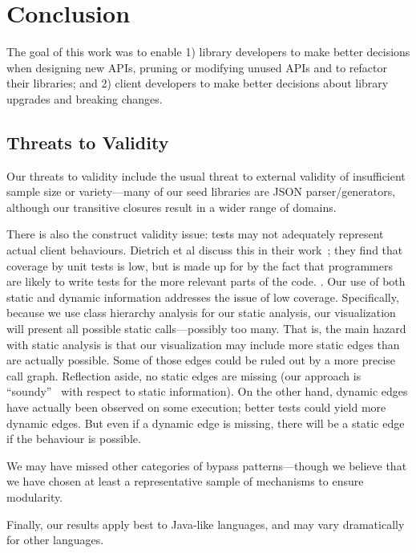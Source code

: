\chapter{Conclusion}
\label{sec:conclusion}
The goal of this work was to enable 1) library developers to make better
decisions when designing new APIs, pruning or modifying unused APIs and to refactor their
libraries; and 2) client developers to make better decisions about library
upgrades and breaking changes.

\section{Threats to Validity}
Our threats to validity include the usual threat to external validity
of insufficient sample size or variety---many of our seed libraries
are JSON parser/generators, although our transitive closures result in
a wider range of domains.

There is also the construct validity issue: tests may
not adequately represent actual client behaviours. 
Dietrich et al discuss this in their work~\cite{dietrich2017construction}; 
they find that coverage by unit tests is low, 
but is made up for by the fact that programmers are likely to write tests for the more relevant parts of the code.
.
Our use of both static
and dynamic information addresses the issue of low coverage. 
Specifically, because we use
class hierarchy analysis for our static analysis, our visualization will present
all possible static calls---possibly too many. 
That is, the main hazard with static analysis is that our visualization may include more
static edges than are actually possible. Some of those edges could be ruled out by a more
precise call graph. Reflection aside, no static edges
are missing (our approach is ``soundy''~\cite{livshits15:_in_defen_sound} with respect to static information). 
On the other hand, dynamic edges have actually been observed
on some execution; better tests could yield more dynamic edges. But even if
a dynamic edge is missing, there will be a static edge if the behaviour is possible.

We may have missed other categories of bypass patterns---though we believe
that we have chosen at least a representative sample of mechanisms to ensure
modularity. 

Finally, our results apply best to Java-like languages, and
may vary dramatically for other languages.

